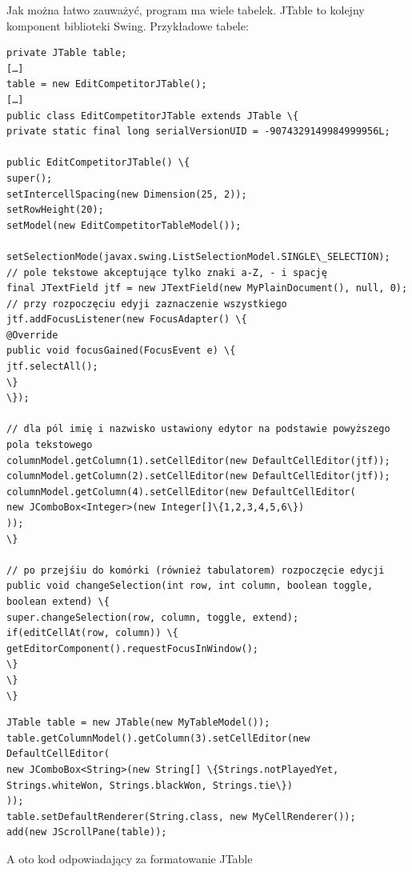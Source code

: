 Jak można łatwo zauważyć, program ma wiele tabelek. JTable to kolejny komponent biblioteki Swing. Przykładowe tabele:
\begin{verbatim}
private JTable table;
[…]
table = new EditCompetitorJTable();
[…]
public class EditCompetitorJTable extends JTable \{
private static final long serialVersionUID = -9074329149984999956L;

public EditCompetitorJTable() \{
super();
setIntercellSpacing(new Dimension(25, 2));
setRowHeight(20);
setModel(new EditCompetitorTableModel());

setSelectionMode(javax.swing.ListSelectionModel.SINGLE\_SELECTION); 
// pole tekstowe akceptujące tylko znaki a-Z, - i spację
final JTextField jtf = new JTextField(new MyPlainDocument(), null, 0);
// przy rozpoczęciu edyji zaznaczenie wszystkiego
jtf.addFocusListener(new FocusAdapter() \{
@Override
public void focusGained(FocusEvent e) \{
jtf.selectAll();
\}
\});

// dla pól imię i nazwisko ustawiony edytor na podstawie powyższego pola tekstowego 
columnModel.getColumn(1).setCellEditor(new DefaultCellEditor(jtf));
columnModel.getColumn(2).setCellEditor(new DefaultCellEditor(jtf));
columnModel.getColumn(4).setCellEditor(new DefaultCellEditor(
new JComboBox<Integer>(new Integer[]\{1,2,3,4,5,6\})
));
\}

// po przejśiu do komórki (również tabulatorem) rozpoczęcie edycji
public void changeSelection(int row, int column, boolean toggle, boolean extend) \{
super.changeSelection(row, column, toggle, extend);
if(editCellAt(row, column)) \{
getEditorComponent().requestFocusInWindow();
\}
\}
\}
\end{verbatim}
\begin{verbatim}
JTable table = new JTable(new MyTableModel());
table.getColumnModel().getColumn(3).setCellEditor(new DefaultCellEditor(
new JComboBox<String>(new String[] \{Strings.notPlayedYet, Strings.whiteWon, Strings.blackWon, Strings.tie\})
));
table.setDefaultRenderer(String.class, new MyCellRenderer());
add(new JScrollPane(table));
\end{verbatim}
A oto kod odpowiadający za formatowanie JTable
